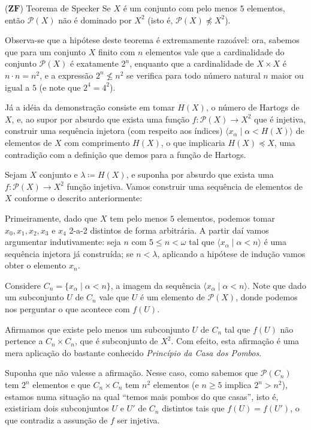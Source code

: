 \documentclass{hipatia}
\newcommand{\n}{\noindent}
\newcommand{\dem}{\n{\bf Demonstração: }}
\newcommand{\partes}[1]{\mathcal{P}(#1)}
\newcommand{\zf}{\mathbf{ZF}}
\begin{document}
\begin{teoremacaixa*}{($\zf$) Teorema de Specker
	\cite{Specker}} Se $X$ é um conjunto com pelo menos $5$
	elementos, então $\partes{X}$ não é dominado por $X^2$
	(isto é, $\partes{X}\npreccurlyeq X^2$).
\end{teoremacaixa*}

Observa-se que a hipótese deste teorema é extremamente
razoável: ora, sabemos que para um conjunto $X$ finito com
$n$ elementos vale que a cardinalidade do conjunto
$\partes{X}$ é exatamente $2^n$, enquanto que a
cardinalidade de $X\times X$ é $n\cdot n=n^2$, e a
expressão $2^n\nleq n^2$ se verifica para todo número
natural $n$ maior ou igual a $5$ (e note que $2^4 = 4^2$).

Já a idéia da demonstração consiste em tomar $H(X)$, o
número de Hartogs de $X$, e, ao supor por absurdo que
exista uma função $f\colon\partes{X}\rightarrow X^2$ que é
injetiva, construir uma sequência injetora (com respeito
aos índices) $\langle x_\alpha\mid\alpha <H(X)\rangle$ de
elementos de $X$ com comprimento $H(X)$, o que implicaria
$H(X)\preccurlyeq X$, uma contradição com a definição que
demos para a função de Hartogs.

\dem Sejam $X$ conjunto e $\lambda\coloneq H(X)$, e suponha por
absurdo que exista uma $f\colon\partes{X}\rightarrow X^2$
função injetiva. Vamos construir uma sequência de
elementos de $X$ conforme o descrito anteriormente:

Primeiramente, dado que $X$ tem pelo menos $5$ elementos,
podemos tomar $x_0, x_1, x_2, x_3$ e $x_4$ 2-a-2 distintos
de forma arbitrária. A partir daí vamos argumentar
indutivamente: seja $n$ com $5\leq n<\omega$ tal que
$\langle x_\alpha\mid\alpha<n\rangle$ é uma sequência
injetora já construída; se $n<\lambda$, aplicando a
hipótese de indução vamos obter o elemento $x_n$.

Considere $C_n=\{x_\alpha\mid\alpha<n\}$, a imagem da
sequência $\langle x_\alpha\mid\alpha<n\rangle$. Note que
dado um subconjunto $U$ de $C_n$ vale que $U$ é um
elemento de $\partes{X}$, donde podemos nos perguntar o
que acontece com $f(U)$.

Afirmamos que existe pelo menos um subconjunto $U$ de
$C_n$ tal que $f(U)$ não pertence a $C_n\times C_n$, que é
subconjunto de $X^2$. Com efeito, esta afirmação é uma
mera aplicação do bastante conhecido {\it Princípio da
Casa dos Pombos}. 

Suponha que não valesse a afirmação. Nesse caso, como
sabemos que $\partes{C_n}$ tem $2^n$ elementos e que
$C_n\times C_n$ tem  $n^2$ elementos (e $n\geq 5$ implica
$2^n>n^2$), estamos numa situação na qual ``temos mais
pombos do que casas'', isto é, existiriam dois
subconjuntos $U$ e $U'$ de $C_n$ distintos tais que
$f(U)=f(U')$, o que contradiz a assunção de $f$ ser
injetiva.
\end{document}
